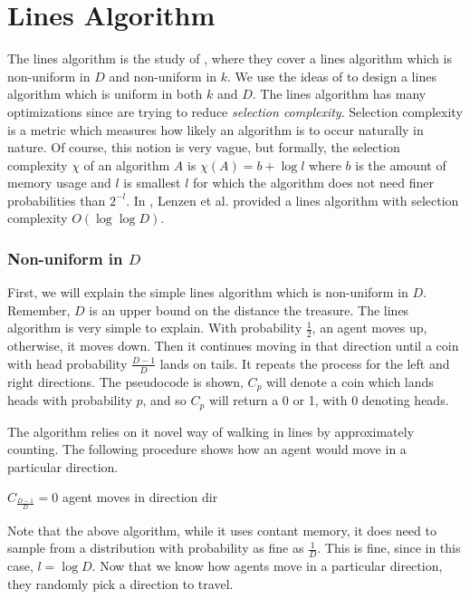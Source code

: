 \documentclass[runningheads,a4paper]{llncs}
\begin{document}
\section{Lines Algorithm}
\label{lines}

The lines algorithm is the study of \cite{lenzen2014trade}, where they cover a lines algorithm which is non-uniform in $D$ and non-uniform in $k$. We use the ideas of \cite{feinerman2012collaborative} to design a lines algorithm which is uniform in both $k$ and $D$. The lines algorithm has many optimizations since \cite{lenzen2014trade} are trying to reduce \emph{selection complexity}. Selection complexity is a metric which measures how likely an algorithm is to occur naturally in nature. Of course, this notion is very vague, but formally, the selection complexity $\chi$ of an algorithm $A$ is $\chi(A) = b + \log l$ where $b$ is the amount of memory usage and $l$ is smallest $l$ for which the algorithm does not need finer probabilities than $2^{-l}$. In \cite{lenzen2014trade}, Lenzen et al. provided a lines algorithm with selection complexity $O(\log \log D)$.

\subsubsection{Non-uniform in $D$} First, we will explain the simple lines algorithm which is non-uniform in $D$. Remember, $D$ is an upper bound on the distance the treasure. The lines algorithm is very simple to explain. With probability $\frac{1}{2}$, an agent moves up, otherwise, it moves down. Then it continues moving in that direction until a coin with head probability $\frac{D-1}{D}$ lands on tails. It repeats the process for the left and right directions. The pseudocode is shown, $C_p$ will denote a coin which lands heads with probability $p$, and so $C_p$ will return a 0 or 1, with 0 denoting heads.

The algorithm relies on it novel way of walking in lines by approximately counting. The following procedure shows how an agent would move in a particular direction. 

\begin{codebox}
\li \While $C_{\frac{D-1}{D}} = 0$ \Then
\li agent moves in direction dir \End
\end{codebox}

Note that the above algorithm, while it uses contant memory, it does need to sample from a distribution with probability as fine as $\frac{1}{D}$. This is fine, since in this case, $l = \log D$. 
Now that we know how agents move in a particular direction, they randomly pick a direction to travel.
\end{document}
